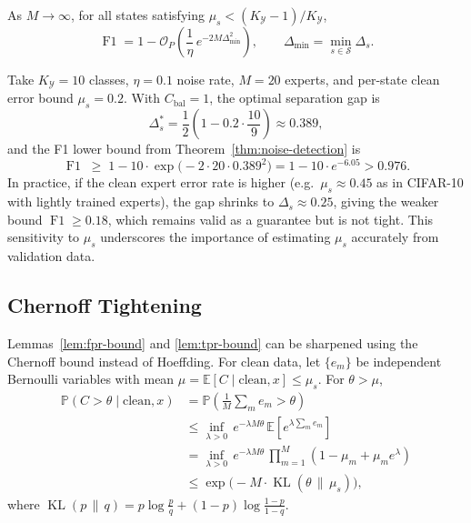 \begin{corollary}
\label{cor:asymptotic}
As $M \to \infty$, for all states satisfying
$\mu_s < (K_{\mathcal{Y}}-1)/K_{\mathcal{Y}}$,
\[
\operatorname{F1} = 1 - \mathcal{O}_P\!\left(
\frac{1}{\eta}\, e^{-2M\Delta_{\min}^2}\right),
\qquad
\Delta_{\min} = \min_{s \in \mathcal{S}} \Delta_s.
\]
\end{corollary}

\begin{example}
\label{ex:thm1-numerical}
Take $K_{\mathcal{Y}} = 10$ classes, $\eta = 0.1$ noise rate, $M = 20$ experts,
and per-state clean error bound $\mu_s = 0.2$. With $C_{\text{bal}} = 1$, the
optimal separation gap is
\[
\Delta_s^* = \frac12\!\left(1 - 0.2 \cdot \frac{10}{9}\right)
\approx 0.389,
\]
and the F1 lower bound from Theorem~\ref{thm:noise-detection} is
\[
\operatorname{F1} \;\geq\; 1 - 10 \cdot
\exp\!\bigl(-2 \cdot 20 \cdot 0.389^2\bigr)
= 1 - 10 \cdot e^{-6.05}
> 0.976.
\]
In practice, if the clean expert error rate is higher (e.g.\
$\mu_s \approx 0.45$ as in CIFAR-10 with lightly trained experts), the gap
shrinks to $\Delta_s \approx 0.25$, giving the weaker bound
$\operatorname{F1} \geq 0.18$, which remains valid as a guarantee but is not
tight. This sensitivity to $\mu_s$ underscores the importance of estimating
$\mu_s$ accurately from validation data.
\end{example}

\subsection{Chernoff Tightening}
\label{sec:thm1:chernoff}

Lemmas~\ref{lem:fpr-bound} and \ref{lem:tpr-bound} can be sharpened using the
Chernoff bound instead of Hoeffding. For clean data, let
$\{e_m\}$ be independent Bernoulli variables with mean
$\mu = \mathbb{E}[C \mid \text{clean}, x] \leq \mu_s$. For
$\theta > \mu$,
\begin{align*}
\mathbb{P}(C > \theta \mid \text{clean}, x)
&= \mathbb{P}\!\left(\frac{1}{M}\sum_{m} e_m > \theta\right) \\
&\leq \inf_{\lambda > 0}\, e^{-\lambda M\theta}\,
   \mathbb{E}\!\left[e^{\lambda\sum_m e_m}\right] \\
&= \inf_{\lambda > 0}\, e^{-\lambda M\theta}\,
   \prod_{m=1}^M (1 - \mu_m + \mu_m e^\lambda) \\
&\leq \exp\!\bigl(-M \cdot \operatorname{KL}(\theta \,\|\, \mu_s)\bigr),
\end{align*}
where $\operatorname{KL}(p \,\|\, q) = p\log\frac{p}{q}
+ (1-p)\log\frac{1-p}{1-q}$.

